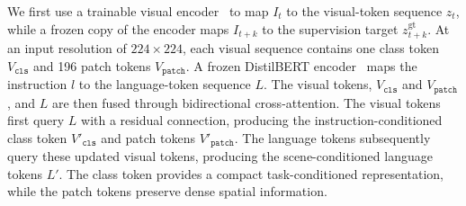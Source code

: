 We first use a trainable visual encoder~\cite{simeoni2025dinov3} to map $I_t$ to the visual-token sequence $z_t$, while a frozen copy of the encoder maps $I_{t+k}$ to the supervision target $z^{\mathrm{gt}}_{t+k}$. At an input resolution of $224\times224$, each visual sequence contains one class token $V_\texttt{cls}$ and 196 patch tokens $V_\texttt{patch}$. A frozen DistilBERT encoder~\cite{sanh2019distilbert} maps the instruction $l$ to the language-token sequence $L$. The visual tokens, $V_\texttt{cls}$ and $V_\texttt{patch}$, and $L$ are then fused through bidirectional cross-attention. The visual tokens first query $L$ with a residual connection, producing the instruction-conditioned class token $V'_{\texttt{cls}}$ and patch tokens $V'_\texttt{patch}$. The language tokens subsequently query these updated visual tokens, producing the scene-conditioned language tokens $L'$. The class token provides a compact task-conditioned representation, while the patch tokens preserve dense spatial information.




